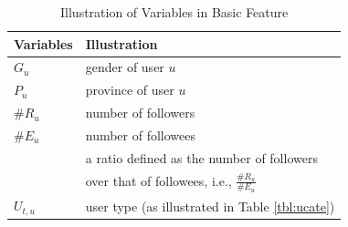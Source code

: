 \begin{table}[tb!]
\centering
\begin{small}
\caption{Illustration of Variables in Basic Feature}
\vspace{0.3cm}
\label{tbl:fe-info}
\begin{tabular}{ll}
\toprule
\multicolumn{1}{l}{\textbf{Variables}} & \multicolumn{1}{l}{\textbf{Illustration}}	\\	\midrule \midrule
$G_u$				& gender of user $u$				\\	\midrule
$P_u$				& province of user $u$				\\	\midrule
\#$R_u$				& number of followers				\\	\midrule
\#$E_u$				& number of followees				\\	\midrule
                    & a ratio defined as the number of followers  \\
\raisebox{1.5ex}{$R_{ee,u}$}  & over that of followees, i.e., $\frac{\#R_u}{\#E_u}$ \\  \midrule
$U_{t,u}$					& user type (as illustrated in Table \ref{tbl:ucate})			\\ \bottomrule
\end{tabular}
\end{small}
\vspace{-1ex}
\end{table}

